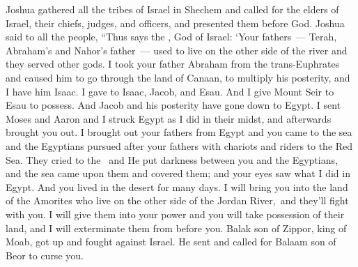 
\begin{inparaenum}
   Joshua gathered all the tribes of Israel in Shechem and called for the elders of Israel, their chiefs, judges, and officers, and presented them before God.%
   Joshua said to all the people, ``Thus says the \lord, God of Israel: `Your fathers~--- Terah, Abraham's and Nahor's father~--- used to live on the other side of the river and they served other gods.%
   I took your father Abraham from the trans-Euphrates and caused him to go through the land of Canaan, to multiply his posterity, and I have him Isaac.%
   I gave to Isaac, Jacob, and Esau. And I give Mount Seir to Esau to possess. And Jacob and his posterity have gone down to Egypt.%
   I sent Moses and Aaron and I struck Egypt as I did in their midst, and afterwards brought you out.%
   I brought out your fathers from Egypt and you came to the sea and the Egyptians pursued after your fathers with chariots and riders to the Red Sea.%
   They cried to the \lord\ and He put darkness between you and the Egyptians, and the sea came upon them and covered them; and your eyes saw what I did in Egypt. And you lived in the desert for many days.%
   I will bring you into the land of the Amorites who live on the other side of the Jordan River,\understood\ and they'll fight with you. I will give them into your power and you will take possession of their land, and I will exterminate them from before you.%
   Balak son of Zippor, king of Moab, got up and fought against Israel. He sent and called for Balaam son of Beor to curse you.%

\end{inparaenum}
